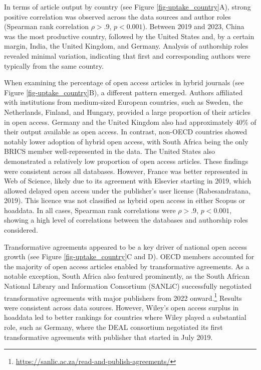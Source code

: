 \documentclass[a4paper,man,floatsintext,longtable,noextraspace,10pt]{apa6}
\begin{document}
In terms of article output by country (see Figure
\ref{fig-uptake_country}A), strong positive correlation was observed
across the data sources and author roles (Spearman rank correlation
\(\rho > .9\), \(p < 0.001\)). Between 2019 and 2023, China was the most
productive country, followed by the United States and, by a certain
margin, India, the United Kingdom, and Germany. Analysis of authorship
roles revealed minimal variation, indicating that first and
corresponding authors were typically from the same country.

When examining the percentage of open access articles in hybrid journals
(see Figure \ref{fig-uptake_country}B), a different pattern emerged.
Authors affiliated with institutions from medium-sized European
countries, such as Sweden, the Netherlands, Finland, and Hungary,
provided a large proportion of their articles in open access. Germany
and the United Kingdom also had approximately 40\% of their output
available as open access. In contrast, non-OECD countries showed notably
lower adoption of hybrid open access, with South Africa being the only
BRICS member well-represented in the data. The United States also
demonstrated a relatively low proportion of open access articles. These
findings were consistent across all databases. However, France was
better represented in Web of Science, likely due to its agreement with
Elsevier starting in 2019, which allowed delayed open access under the
publisher's user license (Rabesandratana, 2019). This licence was not
classified as hybrid open access in either Scopus or hoaddata. In all
cases, Spearman rank correlations were \(\rho > .9\), \(p < 0.001\),
showing a high level of correlations between the databases and
authorship roles considered.

Transformative agreements appeared to be a key driver of national open
access growth (see Figure \ref{fig-uptake_country}C and D). OECD members
accounted for the majority of open access articles enabled by
transformative agreements. As a notable exception, South Africa also
featured prominently, as the South African National Library and
Information Consortium (SANLiC) successfully negotiated transformative
agreements with major publishers from 2022 onward.\footnote{\url{https://sanlic.ac.za/read-and-publish-agreements/}}
Results were consistent across data sources. However, Wiley's open
access surplus in hoaddata led to better rankings for countries where
Wiley played a substantial role, such as Germany, where the DEAL
consortium negotiated its first transformative agreements with publisher
that started in July 2019.
\end{document}
